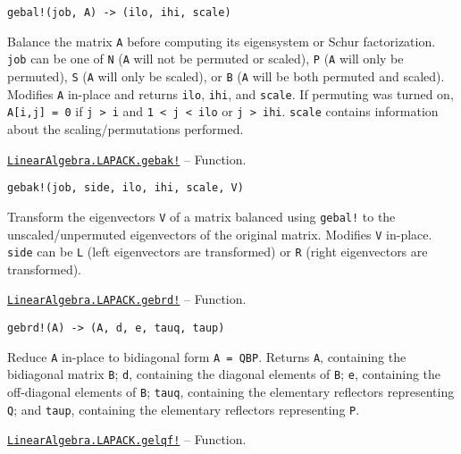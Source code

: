 \begin{adjustwidth}{2em}{0pt}


\begin{verbatim}
gebal!(job, A) -> (ilo, ihi, scale)
\end{verbatim}

Balance the matrix \texttt{A} before computing its eigensystem or Schur factorization. \texttt{job} can be one of \texttt{N} (\texttt{A} will not be permuted or scaled), \texttt{P} (\texttt{A} will only be permuted), \texttt{S} (\texttt{A} will only be scaled), or \texttt{B} (\texttt{A} will be both permuted and scaled). Modifies \texttt{A} in-place and returns \texttt{ilo}, \texttt{ihi}, and \texttt{scale}. If permuting was turned on, \texttt{A[i,j] = 0} if \texttt{j > i} and \texttt{1 < j < ilo} or \texttt{j > ihi}. \texttt{scale} contains information about the scaling/permutations performed.



\end{adjustwidth}
\hypertarget{6051699672892129595}{} 
\hyperlink{6051699672892129595}{\texttt{LinearAlgebra.LAPACK.gebak!}}  -- {Function.}

\begin{adjustwidth}{2em}{0pt}


\begin{verbatim}
gebak!(job, side, ilo, ihi, scale, V)
\end{verbatim}

Transform the eigenvectors \texttt{V} of a matrix balanced using \texttt{gebal!} to the unscaled/unpermuted eigenvectors of the original matrix. Modifies \texttt{V} in-place. \texttt{side} can be \texttt{L} (left eigenvectors are transformed) or \texttt{R} (right eigenvectors are transformed).



\end{adjustwidth}
\hypertarget{12871648146516835346}{} 
\hyperlink{12871648146516835346}{\texttt{LinearAlgebra.LAPACK.gebrd!}}  -- {Function.}

\begin{adjustwidth}{2em}{0pt}


\begin{verbatim}
gebrd!(A) -> (A, d, e, tauq, taup)
\end{verbatim}

Reduce \texttt{A} in-place to bidiagonal form \texttt{A = QBP{\textquotesingle}}. Returns \texttt{A}, containing the bidiagonal matrix \texttt{B}; \texttt{d}, containing the diagonal elements of \texttt{B}; \texttt{e}, containing the off-diagonal elements of \texttt{B}; \texttt{tauq}, containing the elementary reflectors representing \texttt{Q}; and \texttt{taup}, containing the elementary reflectors representing \texttt{P}.



\end{adjustwidth}
\hypertarget{13832119342643409982}{} 
\hyperlink{13832119342643409982}{\texttt{LinearAlgebra.LAPACK.gelqf!}}  -- {Function.}

